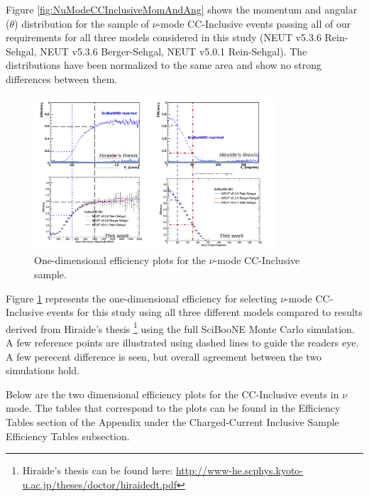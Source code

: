 \documentclass[11pt]{article}
\begin{document}
Figure \ref*{fig:NuModeCCInclusiveMomAndAng} shows the momentum and angular ($\theta$) distribution for the sample of $\nu$-mode CC-Inclusive events passing all of our requirements for all three models considered in this study (NEUT v5.3.6 Rein-Sehgal, NEUT v5.3.6 Berger-Sehgal, NEUT v5.0.1 Rein-Sehgal). The distributions have been normalized to the same area and show no strong differences between them. 

\begin{figure}[H]
\centering
\includegraphics[width=0.8\textwidth]{CCInclusivePlots/CC1DIncEff.png}
\caption{One-dimensional efficiency plots for the $\nu$-mode CC-Inclusive sample.}
\label{fig:OneDEfficiency}
\end{figure}

Figure \ref*{fig:OneDEfficiency} represents the one-dimensional efficiency for selecting $\nu$-mode CC-Inclusive events for this study using all three different models compared to results derived from Hiraide's thesis \footnote{Hiraide's thesis can be found here: \href{http://www-he.scphys.kyoto-u.ac.jp/theses/doctor/hiraide_dt.pdf}{http://www-he.scphys.kyoto-u.ac.jp/theses/doctor/hiraide\textunderscore{}dt.pdf}} using the full SciBooNE Monte Carlo simulation. A few reference points are illustrated using dashed lines to guide the readers eye. A few perecent difference is seen, but overall agreement between the two simulations hold.

Below are the two dimensional efficiency plots for the CC-Inclusive events in $\nu$ mode. The tables that correspond to the plots can be found in the Efficiency Tables section of the Appendix under the Charged-Current Inclusive Sample Efficiency Tables subsection.
\end{document}
